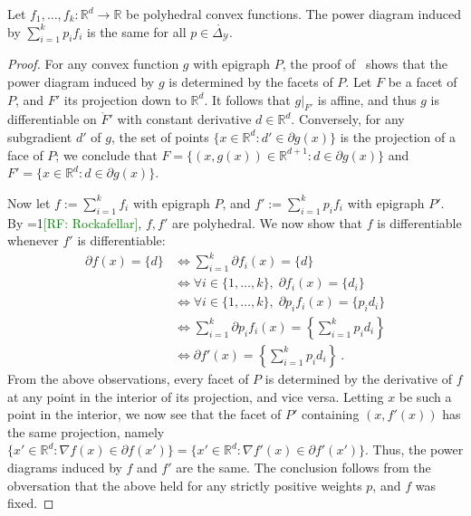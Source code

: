 \documentclass[anon,12pt]{colt2019}
\newcommand{\Comments}{1}
\newcommand{\mynote}[2]{\ifnum\Comments=1\textcolor{#1}{#2}\fi}
\newcommand{\raf}[1]{\mynote{green}{[RF: #1]}}
\newcommand{\reals}{\mathbb{R}}
\newcommand{\simplex}{\Delta_\Y}
\newcommand{\Y}{\mathcal{Y}}
\newcommand{\inter}[1]{\mathring{#1}}%
\begin{document}
\begin{lemma}\label{lem:polyhedral-pd-same}
  Let $f_1,\ldots,f_k:\reals^d\to\reals$ be polyhedral convex functions.
  The power diagram induced by $\sum_{i=1}^k p_i f_i$ is the same for all $p \in \inter\simplex$.
\end{lemma}
\begin{proof}
  For any convex function $g$ with epigraph $P$, the proof of~\citet[Theorem 4]{aurenhammer1987power} shows that the power diagram induced by $g$ is determined by the facets of $P$.
  Let $F$ be a facet of $P$, and $F'$ its projection down to $\reals^d$.
  It follows that $g|_{F'}$ is affine, and thus $g$ is differentiable on $\inter F'$ with constant derivative $d\in\reals^d$.
  Conversely, for any subgradient $d'$ of $g$, the set of points $\{x\in\reals^d : d'\in\partial g(x)\}$ is the projection of a face of $P$; we conclude that $F = \{(x,g(x))\in\reals^{d+1} : d\in\partial g(x)\}$ and $F' = \{x\in\reals^d : d\in\partial g(x)\}$.

  Now let $f := \sum_{i=1}^k f_i$ with epigraph $P$, and $f' := \sum_{i=1}^k p_i f_i$ with epigraph $P'$.
  By \raf{Rockafellar}, $f,f'$ are polyhedral.
  We now show that $f$ is differentiable whenever $f'$ is differentiable:
  \begin{align*}
    \partial f(x) = \{d\}
    &\iff \sum_{i=1}^k \partial f_i(x) = \{d\} \\
    &\iff \forall i\in\{1,\ldots,k\}, \; \partial f_i(x) = \{d_i\} \\
    &\iff \forall i\in\{1,\ldots,k\}, \; \partial p_i f_i(x) = \{p_id_i\} \\
    &\iff \sum_{i=1}^k \partial p_if_i(x) = \left\{\sum_{i=1}^k p_id_i\right\} \\
    &\iff \partial f'(x) = \left\{\sum_{i=1}^k p_id_i\right\}~.
  \end{align*}
  From the above observations, every facet of $P$ is determined by the derivative of $f$ at any point in the interior of its projection, and vice versa.
  Letting $x$ be such a point in the interior, we now see that the facet of $P'$ containing $(x,f'(x))$ has the same projection, namely $\{x'\in\reals^d : \nabla f(x) \in \partial f(x')\} = \{x'\in\reals^d : \nabla f'(x) \in \partial f'(x')\}$.
  Thus, the power diagrams induced by $f$ and $f'$ are the same.
  The conclusion follows from the obversation that the above held for any strictly positive weights $p$, and $f$ was fixed.
\end{proof}
\end{document}
